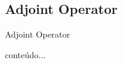 \subsection*{Adjoint Operator}
\begin{frame}{Adjoint Operator}
	\begin{defin}
		conteúdo...
	\end{defin}
\end{frame}